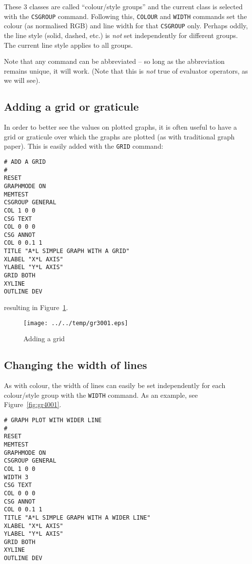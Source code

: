 \documentclass[a4paper,twoside,11pt]{article}
\makeatletter
\def\maxwidth{%
  \ifdim\Gin@nat@width>\linewidth
    \linewidth
  \else
    \Gin@nat@width
  \fi
}
\newcommand{\newpara}{\par\vspace{4mm}\noindent}
\makeatother
\begin{document}
\newpara
These 3 classes are called ``colour/style groups'' and the current class
is selected with the \texttt{CSGROUP} command. Following this,
\texttt{COLOUR} and \texttt{WIDTH} commands set the colour (as
normalised RGB) and line width for that \texttt{CSGROUP} only. Perhaps
oddly, the line style (solid, dashed, etc.) is \emph{not} set
independently for different groups. The current line style applies to
all groups.

\newpara
Note that any command can be abbreviated -- so long as the abbreviation
remains unique, it will work. (Note that this is \emph{not} true of
evaluator operators, as we will see).


\subsection{Adding a grid or graticule}\label{adding-a-grid-or-graticule}
\newpara
In order to better see the values on plotted graphs, it is often useful
to have a grid or graticule over which the graphs are plotted (as with
traditional graph paper). This is easily added with the \texttt{GRID}
command:

\begin{lstlisting}
# ADD A GRID
#
RESET
GRAPHMODE ON
MEMTEST
CSGROUP GENERAL
COL 1 0 0
CSG TEXT
COL 0 0 0
CSG ANNOT
COL 0 0.1 1
TITLE "A*L SIMPLE GRAPH WITH A GRID"
XLABEL "X*L AXIS"
YLABEL "Y*L AXIS"
GRID BOTH
XYLINE
OUTLINE DEV
\end{lstlisting}

\newpara
resulting in Figure~\ref{fig:gr3001}.

\begin{figure}
  \centering
  \texttt{[image: ../../temp/gr3001.eps]}
  \caption{Adding a grid}
  \label{fig:gr3001}
\end{figure}


\subsection{Changing the width of lines}\label{changing-the-width-of-lines}
\newpara
As with colour, the width of lines can easily be set independently for
each colour/style group with the \texttt{WIDTH} command. As an example,
see Figure~\ref{fig:gr4001}.

\begin{lstlisting}
# GRAPH PLOT WITH WIDER LINE
#
RESET
MEMTEST
GRAPHMODE ON
CSGROUP GENERAL
COL 1 0 0
WIDTH 3
CSG TEXT
COL 0 0 0
CSG ANNOT
COL 0 0.1 1
TITLE "A*L SIMPLE GRAPH WITH A WIDER LINE"
XLABEL "X*L AXIS"
YLABEL "Y*L AXIS"
GRID BOTH
XYLINE
OUTLINE DEV
\end{lstlisting}
\end{document}
